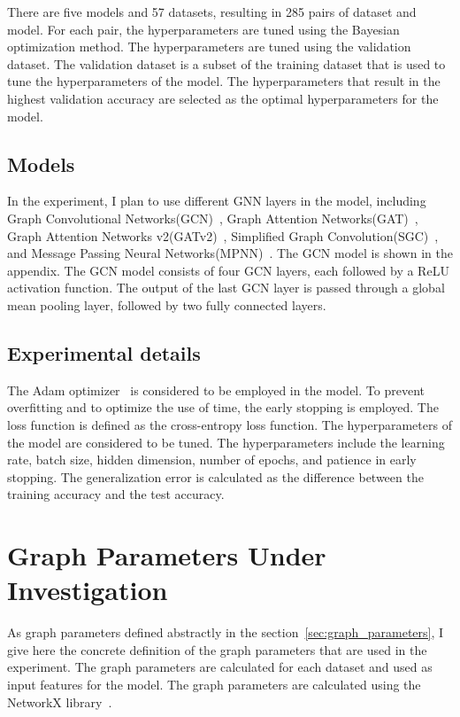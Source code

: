 There are five models and 57 datasets, resulting in 285 pairs of dataset and model. For each pair, the hyperparameters are tuned using the Bayesian optimization method. The hyperparameters are tuned using the validation dataset. The validation dataset is a subset of the training dataset that is used to tune the hyperparameters of the model. The hyperparameters that result in the highest validation accuracy are selected as the optimal hyperparameters for the model.

\subsection{Models}\label{sec:models}
In the experiment, I plan to use different GNN layers in the model, including Graph Convolutional Networks(GCN)~\cite{kipf2016semi}, Graph Attention Networks(GAT)~\cite{velickovic2020pointer}, Graph Attention Networks v2(GATv2)~\cite{brody2021attentive}, Simplified Graph Convolution(SGC)~\cite{wu2019simplifying}, and Message Passing Neural Networks(MPNN)~\cite{gilmer2017neural}. The GCN model is shown in the appendix. The GCN model consists of four GCN layers, each followed by a ReLU activation function. The output of the last GCN layer is passed through a global mean pooling layer, followed by two fully connected layers.

\subsection{Experimental details}
The Adam optimizer~\cite{kingma2014adam} is considered to be employed in the model. To prevent overfitting and to optimize the use of time, the early stopping is employed. The loss function is defined as the cross-entropy loss function. The hyperparameters of the model are considered to be tuned. The hyperparameters include the learning rate, batch size, hidden dimension, number of epochs, and patience in early stopping. The generalization error is calculated as the difference between the training accuracy and the test accuracy. 


\section{Graph Parameters Under Investigation}\label{sec:graph parameters}
As graph parameters defined abstractly in the section~\ref{sec:graph_parameters}, I give here the concrete definition of the graph parameters that are used in the experiment. The graph parameters are calculated for each dataset and used as input features for the model. The graph parameters are calculated using the NetworkX library~\cite{hagberg2008exploring}.

